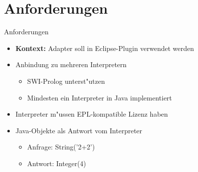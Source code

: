 \documentclass[18pt]{beamer}
\begin{document}
\section{Anforderungen}
\begin{frame}{Anforderungen}
\begin{itemize}
\item \textbf{Kontext:} Adapter soll in Eclipse-Plugin verwendet werden
\vspace{0.3cm}
\item Anbindung zu mehreren Interpretern
\begin{itemize}
\item SWI-Prolog unterst"utzen
\item Mindesten ein Interpreter in Java implementiert
\end{itemize}
\vspace{0.3cm}
\item Interpreter m"ussen EPL-kompatible Lizenz haben
\vspace{0.3cm}
\item Java-Objekte als Antwort vom Interpreter
\begin{itemize}
\item Anfrage: String('2+2')
\item Antwort: Integer(4)
\end{itemize}
\end{itemize}
\end{frame}
\end{document}
